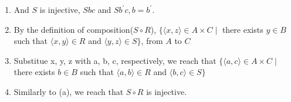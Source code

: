 \documentclass[10pt]{article}
\begin{document}
\begin{enumerate}
\begin{enumerate}
\begin{enumerate}
        \item And $S$ is injective, $S b c$ and $S b^{\prime} c, b=b^{\prime}$.
        \item By the definition of composition($S \circ R$), $\{\langle x, z\rangle \in A \times C \mid$ there exists $y \in B$ such that $\langle x, y\rangle \in R$ and $\langle y, z\rangle \in S\}$, from $A$ to $C$
        \item Substitue x, y, z with a, b, c, respectively, we reach that $\{\langle a, c\rangle \in A \times C \mid$ there exists $b \in B$ such that $\langle a, b\rangle \in R$ and $\langle b, c\rangle \in S\}$
        \item Similarly to (a), we reach that $S \circ R$ is injective.
      \end{enumerate}
  \end{enumerate}
  \end{enumerate}
\end{document}
